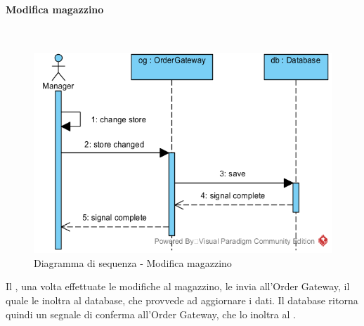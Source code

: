 \begin{samepage}
\paragraph{Modifica magazzino}\mbox{}\\
\end{samepage}
\begin{figure}[H]
	\centering
	\includegraphics[width=15cm]{../../documenti/SpecificaTecnica/diagrammi/sequenza/direttore_modifica_magazzino.png}
	\caption{Diagramma di sequenza - Modifica magazzino}
\end{figure}
Il \Manager{}, una volta effettuate le modifiche al magazzino, le invia all'Order Gateway, il quale le inoltra al database, che provvede ad aggiornare i dati. Il database ritorna quindi un segnale di conferma all'Order Gateway, che lo inoltra al \Manager{}.


